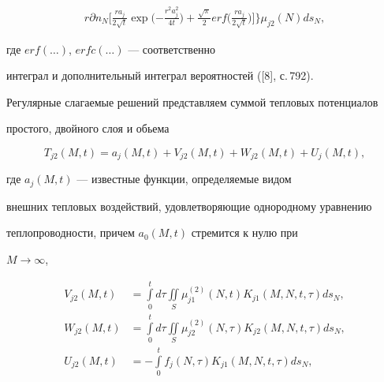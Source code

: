 \begin{pf}
\begin{align}
{{r}}{{\partial n_{N}}} \bigg[{\frac{{ra_{j}}}{{2\sqrt {t}}}\exp \bigg(


{-\frac{{r^{2}a_{j}^{2}}}{{4t}}}\bigg)+\frac{{\sqrt {\pi} 


}}{{2}}erf \bigg({\frac{{ra_{j}}}{{2\sqrt {t}}}}\bigg)}\bigg]


\bigg\}\mu_{j2}({N})ds_{N},


\end{align}


где $erf({\dotsc})$, $erfc({\dotsc})$ --- соответственно 


интеграл и дополнительный интеграл вероятностей ([8], с.\,792).





Регулярные слагаемые решений представляем суммой тепловых потенциалов 


простого, двойного слоя и обьема


\begin{equation}


\label{eq21}


T_{j2} ({M,t})=a_{j} ({M,t})+V_{j2}


({M,t})+W_{j2} ({M,t})+U_{j} ({M,t}),


\end{equation}


где $a_{j}({M,t})$ --- известные функции, определяемые видом 


внешних тепловых воздействий, удовлетворяющие однородному уравнению 


теплопроводности, причем $a_{0} ({M,t})$ стремится к нулю при 


$M \to \infty$,


\begin{align*}


V_{j2} ({M,t})&=\int\limits_{0}^{t} {} d\tau 


\iint\limits_{S} {} \mu_{j1}^{({2})} ({N,t})K_{j1} ({M,N,t,\tau})ds_{N},\\


%


W_{j2} ({M,t})&=\int\limits_{0}^{t} {} d\tau 


\iint\limits_{S} {} \mu_{j2}^{({2})} ({N,\tau} 


)K_{j2} ({M,N,t,\tau})ds_{N}, \\


%


U_{j2} ({M,t})&=- \int\limits_{0}^{t} {} f_{j} ({N,\tau 


})K_{j1} ({M,N,t,\tau})ds_{N},



\end{align*}
\end{pf}
